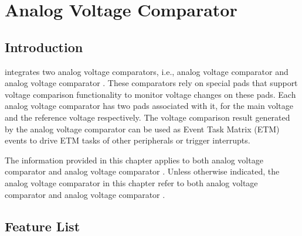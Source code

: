 \documentclass[main\_\_EN.tex]{subfiles}
\begin{document}

\ifglobal
\else
    {\let\clearpage\relax \listoftodos}
    {\let\clearpage\relax \listofdonetodos}
    \tableofcontents
\fi



\hypertarget{anacom}{}
\chapter{Analog Voltage Comparator}
\label{mod:anacom}



\section{Introduction}

\chipname{} integrates two analog voltage comparators, i.e., analog voltage comparator  and analog voltage comparator . These comparators rely on special pads that support voltage comparison functionality to monitor voltage changes on these pads. Each analog voltage comparator has two pads associated with it, for the main voltage and the reference voltage respectively. The voltage comparison result generated by the analog voltage comparator can be used as Event Task Matrix (ETM) events to drive ETM tasks of other peripherals or trigger interrupts.

\begin{tiplisting}
The information provided in this chapter applies to both analog voltage comparator  and analog voltage comparator . Unless otherwise indicated, the analog voltage comparator in this chapter refer to both analog voltage comparator  and analog voltage comparator .
\end{tiplisting}


\section{Feature List}
\label{sec:anacom-features}
\end{document}
